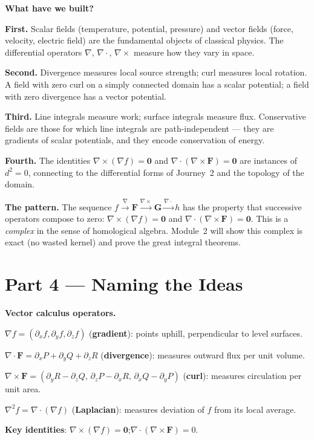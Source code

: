 \documentclass[12pt,a4paper]{article}
\begin{document}
\begin{discoverybox}
\textbf{What have we built?}

\textbf{First.} Scalar fields (temperature, potential, pressure) and vector fields (force, velocity, electric field) are the fundamental objects of classical physics. The differential operators $\nabla$, $\nabla\cdot$, $\nabla\times$ measure how they vary in space.

\textbf{Second.} Divergence measures local source strength; curl measures local rotation. A field with zero curl on a simply connected domain has a scalar potential; a field with zero divergence has a vector potential.

\textbf{Third.} Line integrals measure work; surface integrals measure flux. Conservative fields are those for which line integrals are path-independent --- they are gradients of scalar potentials, and they encode conservation of energy.

\textbf{Fourth.} The identities $\nabla\times(\nabla f)=\mathbf{0}$ and $\nabla\cdot(\nabla\times\mathbf{F})=\mathbf{0}$ are instances of $d^2=0$, connecting to the differential forms of Journey~2 and the topology of the domain.

\medskip
\textbf{The pattern.} The sequence $f \xrightarrow{\nabla} \mathbf{F} \xrightarrow{\nabla\times} \mathbf{G} \xrightarrow{\nabla\cdot} h$ has the property that successive operators compose to zero: $\nabla\times(\nabla f)=\mathbf{0}$ and $\nabla\cdot(\nabla\times\mathbf{F})=\mathbf{0}$. This is a \emph{complex} in the sense of homological algebra. Module~2 will show this complex is exact (no wasted kernel) and prove the great integral theorems.
\end{discoverybox}

\section{Part 4 \texorpdfstring{---}{--} Naming the Ideas}

\begin{namebox}
\textbf{Vector calculus operators.}

$\nabla f = \left(\partial_x f,\partial_y f,\partial_z f\right)$ (\textbf{gradient}): points uphill, perpendicular to level surfaces.

$\nabla\cdot\mathbf{F} = \partial_x P+\partial_y Q+\partial_z R$ (\textbf{divergence}): measures outward flux per unit volume.

$\nabla\times\mathbf{F} = (\partial_y R-\partial_z Q,\, \partial_z P-\partial_x R,\, \partial_x Q-\partial_y P)$ (\textbf{curl}): measures circulation per unit area.

$\nabla^2 f = \nabla\cdot(\nabla f)$ (\textbf{Laplacian}): measures deviation of $f$ from its local average.

\textbf{Key identities}: $\nabla\times(\nabla f)=\mathbf{0}$;\quad $\nabla\cdot(\nabla\times\mathbf{F})=0$.
\end{namebox}
\end{document}
